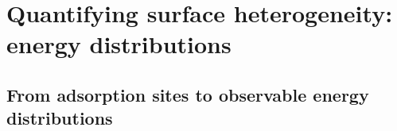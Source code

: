 \documentclass[journal=jacsat,manuscript=article]{achemso}
\begin{document}

	\section{Quantifying surface heterogeneity: energy distributions}
	\label{sec:heterogeneity}
	
	\subsection{From adsorption sites to observable energy distributions}
	\label{sec:condensation}
	
\end{document}
